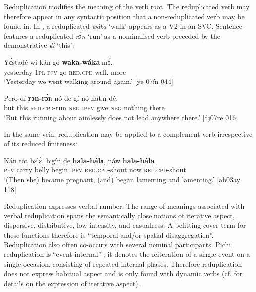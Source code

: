 Reduplication modifies the meaning of the verb root. The reduplicated verb may therefore appear in any syntactic position that a non-reduplicated verb may be found in. In , a reduplicated \textit{wáka} ‘walk’ appears as a V2 in an SVC. Sentence  features a reduplicated \textit{rɔ́n} ‘run’ as a nominalised verb preceded by the demonstrative \textit{dí} ‘this’: 

\ea%
    \label{ex:key:135}
    \gll Yɛ́stadé    wi  kán  gó  \textbf{waka-wáka}  mɔ́.\\
yesterday  \textsc{1pl}  \textsc{pfv}  go  \textsc{red}.\textsc{cpd}{}-walk  more\\
\glt ‘Yesterday we went walking around again.’ [ye 07fn 044]\\

\z

\ea%
    \label{ex:key:136}
    \gll Pero    dí  \textbf{rɔn-rɔ́n}    nó  de  gí  nó  nátín  dé.\\
but    this  \textsc{red.cpd}{}-run  \textsc{neg}  \textsc{ipfv}  give  \textsc{neg}  nothing  there\\

\glt ‘But this running about aimlessly does not lead anywhere there.’ [dj07re 016]
\z

In the same vein, reduplication may be applied to a complement verb irrespective of its reduced finiteness:


\ea%
    \label{ex:key:137}
    \gll Kán  tót    bɛlɛ́,    bigín  de  \textbf{hala-hála},    náw    \textbf{hala-hála}.\\
\textsc{pfv}  carry  belly  begin  \textsc{ipfv}  \textsc{red.cpd-}shout    now    \textsc{red.cpd-}shout\\

\glt ‘(Then she) became pregnant, (and) began lamenting and lamenting.’ [ab03ay 118]
\z

Reduplication expresses verbal number. The range of meanings associated with verbal reduplication spans the semantically close notions of iterative aspect, dispersive, distributive, low intensity, and casualness. A befitting cover term for these functions therefore is “temporal and/or spatial disaggregation”. Reduplication also often co-occurs with several nominal participants. Pichi reduplication is “event-internal” \citep[238]{Cusic1981}; it denotes the reiteration of a single event on a single occasion, consisting of repeated internal phases. Therefore reduplication does not express habitual aspect and is only found with dynamic verbs (cf.  for details on the expression of iterative aspect). 


